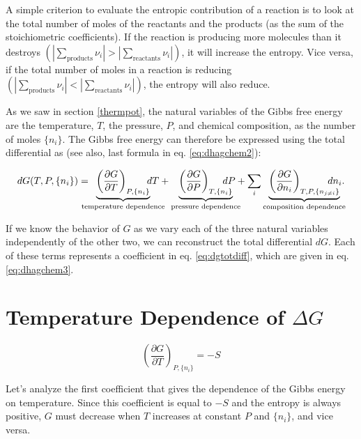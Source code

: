 \documentclass[
  9pt,
]{extbook}
\theoremstyle{definition}
\theoremstyle{definition}
\theoremstyle{definition}
\theoremstyle{remark}
\begin{document}
A simple criterion to evaluate the entropic contribution of a reaction is to look at the total number of moles of the reactants and the products (as the sum of the stoichiometric coefficients). If the reaction is producing more molecules than it destroys \(\left( \left| \sum_\text{products} \nu_i \right| > \left| \sum_\text{reactants} \nu_i \right| \right)\), it will increase the entropy. Vice versa, if the total number of moles in a reaction is reducing \(\left( \left| \sum_\text{products} \nu_i \right| < \left| \sum_\text{reactants} \nu_i \right| \right)\), the entropy will also reduce.

As we saw in section \ref{thermpot}, the natural variables of the Gibbs free energy are the temperature, \(T\), the pressure, \(P\), and chemical composition, as the number of moles \(\{n_i\}\). The Gibbs free energy can therefore be expressed using the total differential as (see also, last formula in eq. \eqref{eq:dhagchem2}):

\begin{equation}
dG(T,P,\{n_i\}) = \mkern-18mu \underbrace{\left(\frac{\partial G}{\partial T} \right)_{P,\{n_i\}}}_{\text{temperature dependence}} \mkern-36mu dT + \underbrace{\left(\frac{\partial G}{\partial P} \right)_{T,\{n_i\}}}_{\text{pressure dependence}} \mkern-36mu dP + \sum_i \underbrace{\left(\frac{\partial G}{\partial n_i} \right)_{T,P,\{n_{j \neq i}\}}}_{\text{composition dependence}} \mkern-36mu dn_i.
\label{eq:dgtotdiff}
\end{equation}

If we know the behavior of \(G\) as we vary each of the three natural variables independently of the other two, we can reconstruct the total differential \(dG\). Each of these terms represents a coefficient in eq. \eqref{eq:dgtotdiff}, which are given in eq. \eqref{eq:dhagchem3}.

\hypertarget{temperature-dependence-of-delta-g}{%
\section{\texorpdfstring{Temperature Dependence of \(\Delta G\)}{Temperature Dependence of \textbackslash Delta G}}\label{temperature-dependence-of-delta-g}}

\[
\left(\frac{\partial G}{\partial T} \right)_{P,\{n_i\}}=-S
\]

Let's analyze the first coefficient that gives the dependence of the Gibbs energy on temperature. Since this coefficient is equal to \(-S\) and the entropy is always positive, \(G\) must decrease when \(T\) increases at constant \(P\) and \(\{n_i\}\), and vice versa.
\end{document}
